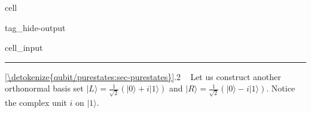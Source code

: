\documentclass[letterpaper,10pt,english]{jupyterBook}
\begin{document}
\begin{sphinxuseclass}{cell}
\begin{sphinxuseclass}{tag_hide-output}
\begin{sphinxVerbatimInput}
\begin{sphinxuseclass}{cell_input}
\begin{sphinxVerbatim}[commandchars=\\\{\}]
    

 
\end{sphinxVerbatim}

\end{sphinxuseclass}\end{sphinxVerbatimInput}

\end{sphinxuseclass}
\end{sphinxuseclass}

\bigskip\hrule\bigskip


\sphinxAtStartPar
{} \hyperref[\detokenize{qubit/purestates:sec-purestates}]{\ref{\detokenize{qubit/purestates:sec-purestates}}}.2    Let us construct another orthonormal basis set \(|L\rangle = \frac{1}{\sqrt{2}}\left(|0\rangle + i |1\rangle\right)\) and \(|R\rangle = \frac{1}{\sqrt{2}}\left(|0\rangle - i |1\rangle\right)\).  Notice the complex unit \(i\) on \(|1\rangle\).
\end{document}
